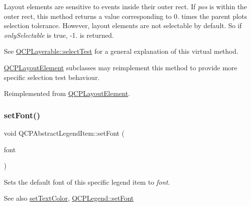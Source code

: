 Layout elements are sensitive to events inside their outer rect. If {\itshape pos} is within the outer rect, this method returns a value corresponding to 0. times the parent plot\textquotesingle{}s selection tolerance. However, layout elements are not selectable by default. So if {\itshape only\+Selectable} is true, -\/1. is returned.

See \hyperlink{class_q_c_p_layerable_a04db8351fefd44cfdb77958e75c6288e}{Q\+C\+P\+Layerable\+::select\+Test} for a general explanation of this virtual method.

\hyperlink{class_q_c_p_layout_element}{Q\+C\+P\+Layout\+Element} subclasses may reimplement this method to provide more specific selection test behaviour. 

Reimplemented from \hyperlink{class_q_c_p_layout_element_ae97f483cccedadbf18ea4525ef240ee4}{Q\+C\+P\+Layout\+Element}.

\mbox{\label{class_q_c_p_abstract_legend_item_a409c53455d8112f71d70c0c43eb10265}} 
\subsubsection{\texorpdfstring{set\+Font()}{setFont()}}
{\footnotesize\ttfamily void Q\+C\+P\+Abstract\+Legend\+Item\+::set\+Font (\begin{DoxyParamCaption}\item[{const Q\+Font \&}]{font }\end{DoxyParamCaption})}

Sets the default font of this specific legend item to {\itshape font}.

\begin{DoxySeeAlso}{See also}
\hyperlink{class_q_c_p_abstract_legend_item_a6ebace6aaffaedcdab2d74e88acc2d1e}{set\+Text\+Color}, \hyperlink{class_q_c_p_legend_aa4cda8499e3cb0f3be415edc02984c73}{Q\+C\+P\+Legend\+::set\+Font} 
\end{DoxySeeAlso}
\mbox{\label{class_q_c_p_abstract_legend_item_a9913ef48730551b696e7f98a2391c599}} 
